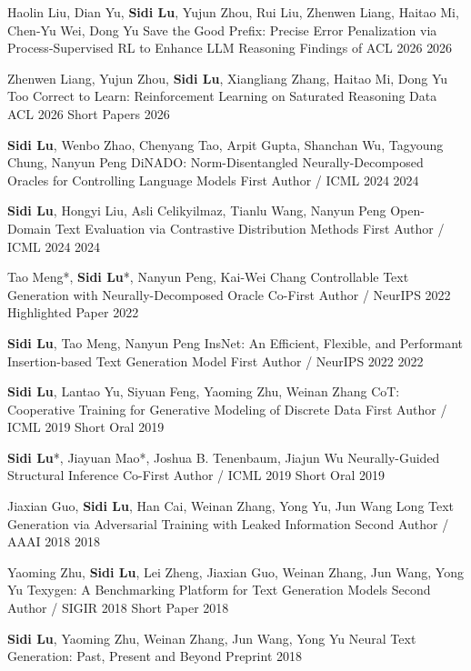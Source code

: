\begin{cventries}
  \cventry
    {Haolin Liu, Dian Yu, \textbf{Sidi Lu}, Yujun Zhou, Rui Liu, Zhenwen Liang, Haitao Mi, Chen-Yu Wei, Dong Yu}
    {Save the Good Prefix: Precise Error Penalization via Process-Supervised RL to Enhance LLM Reasoning}
    {Findings of ACL 2026}
    {2026}
    {}

  \cventry
    {Zhenwen Liang, Yujun Zhou, \textbf{Sidi Lu}, Xiangliang Zhang, Haitao Mi, Dong Yu}
    {Too Correct to Learn: Reinforcement Learning on Saturated Reasoning Data}
    {ACL 2026 Short Papers}
    {2026}
    {}

  \cventry
    {\textbf{Sidi Lu}, Wenbo Zhao, Chenyang Tao, Arpit Gupta, Shanchan Wu, Tagyoung Chung, Nanyun Peng}
    {DiNADO: Norm-Disentangled Neurally-Decomposed Oracles for Controlling Language Models}
    {First Author / ICML 2024}
    {2024}
    {}

  \cventry
    {\textbf{Sidi Lu}, Hongyi Liu, Asli Celikyilmaz, Tianlu Wang, Nanyun Peng}
    {Open-Domain Text Evaluation via Contrastive Distribution Methods}
    {First Author / ICML 2024}
    {2024}
    {}

  \cventry
    {Tao Meng*, \textbf{Sidi Lu}*, Nanyun Peng, Kai-Wei Chang}
    {Controllable Text Generation with Neurally-Decomposed Oracle}
    {Co-First Author / NeurIPS 2022 Highlighted Paper}
    {2022}
    {}

  \cventry
    {\textbf{Sidi Lu}, Tao Meng, Nanyun Peng}
    {InsNet: An Efficient, Flexible, and Performant Insertion-based Text Generation Model}
    {First Author / NeurIPS 2022}
    {2022}
    {}

  \cventry
    {\textbf{Sidi Lu}, Lantao Yu, Siyuan Feng, Yaoming Zhu, Weinan Zhang}
    {CoT: Cooperative Training for Generative Modeling of Discrete Data}
    {First Author / ICML 2019 Short Oral}
    {2019}
    {}

  \newpage

  \cventry
    {\textbf{Sidi Lu}*, Jiayuan Mao*, Joshua B. Tenenbaum, Jiajun Wu}
    {Neurally-Guided Structural Inference}
    {Co-First Author / ICML 2019 Short Oral}
    {2019}
    {}

  \cventry
    {Jiaxian Guo, \textbf{Sidi Lu}, Han Cai, Weinan Zhang, Yong Yu, Jun Wang}
    {Long Text Generation via Adversarial Training with Leaked Information}
    {Second Author / AAAI 2018}
    {2018}
    {}

  \cventry
    {Yaoming Zhu, \textbf{Sidi Lu}, Lei Zheng, Jiaxian Guo, Weinan Zhang, Jun Wang, Yong Yu}
    {Texygen: A Benchmarking Platform for Text Generation Models}
    {Second Author / SIGIR 2018 Short Paper}
    {2018}
    {}

  \cventry
    {\textbf{Sidi Lu}, Yaoming Zhu, Weinan Zhang, Jun Wang, Yong Yu}
    {Neural Text Generation: Past, Present and Beyond}
    {Preprint}
    {2018}
    {}
\end{cventries}

